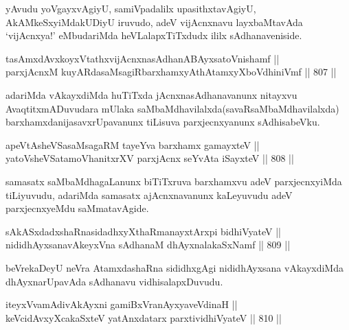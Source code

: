 \begin{artha}
yAvudu yoVgayxvAgiyU, samiVpadalilx upasithxtavAgiyU, AkAMkeSxyiMdakUDiyU iruvudo, adeV vijAcnxnavu layxbaMtavAda `vijAcnxya!' eMbudariMda heVLalapxTiTxdudx ililx sAdhanaveniside.
\end{artha}

\begin{shl}
tasAmxdAvxkoyxVtathxvijAcnxnasAdhanABAyxsatoV\s nishamf || \\
parxjAcnxM kuyARdasaMsagiRbarxhamxyAthAtamxyXboVdhiniVmf \hfill || 807 ||  
\end{shl}

\begin{artha}
adariMda vAkayxdiMda huTiTxda jAcnxnasAdhanavanunx nitayxvu AvaqtitxmADuvudara mUlaka saMbaMdhavilalxda(savaRsaMbaMdhavilalxda) barxhamxdanijasavxrUpavanunx tiLisuva parxjecnxyanunx sAdhisabeVku.
\end{artha}

\begin{shl}
apeVtAsheVSasaMsagaRM tayeYva barxhamx gamayxteV || \\
yatoV\s sheVSatamoVhanitxrXV parxjAcnx seYvAta iSayxteV \hfill || 808 ||  
\end{shl}

\begin{artha}
samasatx saMbaMdhagaLanunx biTiTxruva barxhamxvu adeV parxjecnxyiMda tiLiyuvudu, adariMda samasatx ajAcnxnavanunx kaLeyuvudu adeV parxjecnxyeMdu saMmatavAgide.
\end{artha}


\begin{shl}
sAkASxdadxshaRnasidadhxyXthaRmanayxtArxpi bidhiVyateV || \\
nididhAyxsanavAkeyxVna sAdhanaM dhAyxnalakaSxNamf \hfill || 809 ||  
\end{shl}

\begin{artha}
beVrekaDeyU neVra AtamxdashaRna sididhxgAgi nididhAyxsana vAkayxdiMda dhAyxnarUpavAda sAdhanavu vidhisalapxDuvudu.
\end{artha}

\begin{shl}
iteyxVvamAdivAkAyxni gamiBxVranAyxyaveVdinaH || \\
keVcidAvxyXcakaSxteV yatAnxdatarx parxtividhiVyateV \hfill || 810 ||  
\end{shl}

